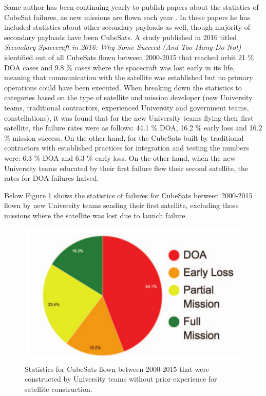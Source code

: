 \documentclass[english,12pt,a4paper,pdftex,elec,utf8]{aaltothesis}
\begin{document}
Same author has been continuing yearly to publish papers about the statistics of CubeSat failures, as new missions are flown each year \cite{Swart2016, Swart2015}. In these papers he has included statistics about other secondary payloads as well, though majority of secondary payloads have been CubeSats. A study published in 2016 titled \textit{Secondary Spacecraft in 2016:
Why Some Succeed (And Too Many Do Not)} identified out of all CubeSats flown between 2000-2015 that reached orbit 21 \% DOA cases and 9.8 \% cases where the spacecraft was lost early in its life, meaning that communication with the satellite was established but no primary operations could have been executed. When breaking down the statistics to categories based on the type of satellite and mission developer (new University teams, traditional contractors, experienced University and government teams, constellations), it was found that for the new University teams flying their first satellite, the failure rates were as follows: 44.1 \% DOA, 16.2 \% early loss and 16.2 \% mission success. On the other hand, for the CubeSats built by traditional contractors with established practices for integration and testing the numbers were: 6.3 \% DOA and 6.3 \% early loss. On the other hand, when the new University teams educated by their first failure flew their second satellite, the rates for DOA failures halved. \cite{Swart2016, Swart2015}\par 
Below Figure \ref{hobbyistflown2015pic} shows the statistics of failures for CubeSats between 2000-2015 flown by new University teams sending their first satellite, excluding those missions where the satellite was lost due to launch failure.\par 
\begin{figure}[h!]
\includegraphics[scale=0.5]{hobbyistflown2015}
\caption{Statistics for CubeSats flown between 2000-2015 that were constructed by University teams without prior experience for satellite construction. \cite{Swart2016}}
\label{hobbyistflown2015pic}
\end{figure} 
\end{document}
